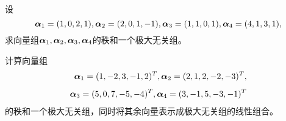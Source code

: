 


\begin{frame}\ft{\subsecname}
  
  \begin{li}[2005-2006第二学期]
    设$$\boldsymbol{\alpha}_1=(1,0,2,1),\boldsymbol{\alpha}_2=(2,0,1,-1),\boldsymbol{\alpha}_3=(1,1,0,1),\boldsymbol{\alpha}_4=(4,1,3,1),$$
    求向量组$\boldsymbol{\alpha}_1,\boldsymbol{\alpha}_2,\boldsymbol{\alpha}_3,\boldsymbol{\alpha}_4$的秩和一个极大无关组。
  \end{li}  
\end{frame}


\begin{frame}\ft{\subsecname}                              
  \begin{li}[2006-2007第二学期]
    计算向量组$$
    \begin{aligned}
      \boldsymbol{\alpha}_1=(1,-2,3,-1,2)^T,\boldsymbol{\alpha}_2=(2,1,2,-2,-3)^T, \\[1ex]
      \boldsymbol{\alpha}_3=(5,0,7,-5,-4)^T,\boldsymbol{\alpha}_4=(3,-1,5,-3,-1)^T
    \end{aligned}$$
    的秩和一个极大无关组，同时将其余向量表示成极大无关组的线性组合。
  \end{li}
  
\end{frame}






